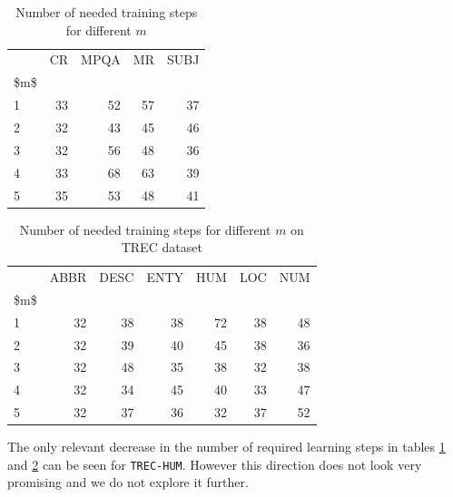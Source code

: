 \begin{table}[H]
\begin{center}

\begin{tabular}{lrrrr}
\toprule
{} & CR & MPQA & MR & SUBJ \\
\$m\$ &      &       &      &       \\
\midrule
1  &     33 &      52 &     57 &      37 \\
2  &     32 &      43 &     45 &      46 \\
3  &     32 &      56 &     48 &      36 \\
4  &     33 &      68 &     63 &      39 \\
5  &     35 &      53 &     48 &      41 \\
\bottomrule
\end{tabular}

\caption[Number of needed training steps for different $m$]{Number of needed training steps for different $m$}
\label{tab:multyw:steps}
\end{center}
\end{table}


\begin{table}[H]
\begin{center}

\begin{tabular}{lrrrrrr}
\toprule
{} & ABBR & DESC & ENTY & HUM & LOC & NUM \\
\$m\$ &          &          &          &         &         &         \\
\midrule
1  &        32 &        38 &        38 &        72 &        38 &        48 \\
2  &        32 &        39 &        40 &        45 &        38 &        36 \\
3  &        32 &        48 &        35 &        38 &        32 &        38 \\
4  &        32 &        34 &        45 &        40 &        33 &        47 \\
5  &        32 &        37 &        36 &        32 &        37 &        52 \\
\bottomrule
\end{tabular}

\caption[Number of needed training steps for different $m$ on TREC dataset]{Number of needed training steps for different $m$ on TREC dataset}
\label{tab:multyw:steps:trec}
\end{center}
\end{table}

    The only relevant decrease in the number of required learning steps in tables \ref{tab:multyw:steps} and \ref{tab:multyw:steps:trec} can be seen for \texttt{TREC-HUM}.
    However this direction does not look very promising and we do not explore it further.
    